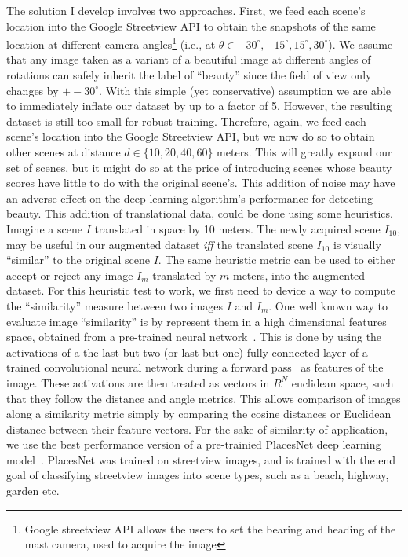 The solution I develop involves two approaches. First, we feed each scene's location into the Google Streetview API to obtain the snapshots of the same location at different camera angles\footnote{Google streetview API allows the users to set the bearing and heading of the mast camera, used to acquire the image} (i.e., at $\theta \in {-30^{\circ}, -15^{\circ} , 15^{\circ} , 30^{\circ} }$). We assume that any image taken as a variant of a beautiful image at different angles of rotations can safely inherit the label of ``beauty'' since the field of view only changes by $+- 30^\circ $. With this simple (yet conservative) assumption we are able to immediately inflate our dataset by up to a factor of 5.
However, the resulting dataset is still too small for robust training. Therefore, again, we feed each scene's location into the Google Streetview API, but we now do so to obtain other scenes at  distance $d \in \{10,20,40,60\}$ meters.  This will greatly expand our set of scenes, but it might do so at the price of introducing scenes whose beauty scores have little to do with the original scene's. 
This addition of noise may have an adverse effect on the deep learning algorithm's performance for detecting beauty. 
This addition of translational data, could be done using some heuristics. Imagine a scene $I$ translated in space by 10 meters. The newly acquired scene $I_{10}$, may be useful in our augmented dataset \textit{iff} the translated scene $I_{10}$ is visually ``similar'' to the original scene $I$. The same heuristic metric can be used to either accept or reject any image $I_{m}$ translated by $m$ meters, into the augmented dataset. 
For this heuristic test to work, we first need to device a way to compute the ``similarity'' measure between two images $I$ and $I_{m}$. 
One well known way to evaluate image ``similarity'' is by represent them in a high dimensional features space, obtained from a pre-trained neural network~\cite{zhang2018unreasonable}. This is done by using the activations of a the last but two (or last but one) fully connected layer of a trained convolutional neural network during a forward pass~\cite{babenko2015aggregating,Lin_2015_CVPR_Workshops,varga2016fast} as features of the image. These activations are then treated as vectors in $R^N$ euclidean space, such that they follow the distance and angle metrics. This allows comparison of images along a similarity metric simply by comparing the cosine distances or Euclidean distance between their feature vectors. For the sake of similarity of application, we use the best performance version of a pre-trainied PlacesNet deep learning model~\cite{zhou2014learning}. PlacesNet was trained on streetview images, and is trained with the end goal of classifying streetview images into scene types, such as a beach, highway, garden etc. 

